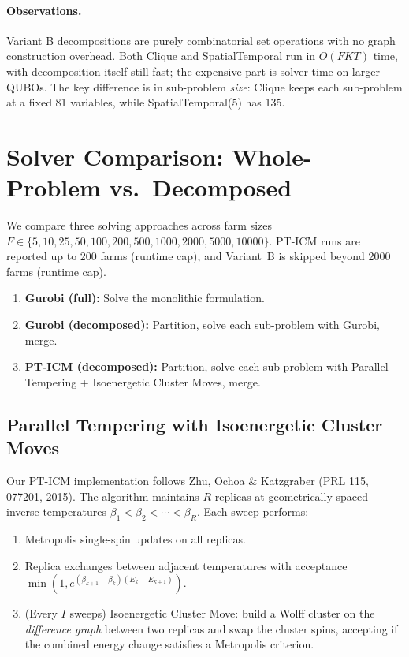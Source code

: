 \documentclass[11pt,a4paper]{article}
\begin{document}
\paragraph{Observations.}
Variant B decompositions are purely combinatorial set operations with no graph
construction overhead. Both Clique and SpatialTemporal run in $O(FKT)$ time,
with decomposition itself still fast; the expensive part is solver time on larger
QUBOs. The key difference is in sub-problem \emph{size}: Clique keeps each
sub-problem at a fixed 81 variables, while SpatialTemporal(5) has 135.

\section{Solver Comparison: Whole-Problem vs.\ Decomposed}
\label{sec:solvers}

We compare three solving approaches across farm sizes
$F \in \{5, 10, 25, 50, 100, 200, 500, 1000, 2000, 5000, 10000\}$.
PT-ICM runs are reported up to 200 farms (runtime cap), and Variant~B is skipped
beyond 2000 farms (runtime cap).

\begin{enumerate}
  \item \textbf{Gurobi (full):} Solve the monolithic formulation.
  \item \textbf{Gurobi (decomposed):} Partition, solve each sub-problem with Gurobi,
    merge.
  \item \textbf{PT-ICM (decomposed):} Partition, solve each sub-problem with Parallel
    Tempering + Isoenergetic Cluster Moves, merge.
\end{enumerate}

\subsection{Parallel Tempering with Isoenergetic Cluster Moves}

Our PT-ICM implementation follows Zhu, Ochoa \& Katzgraber (PRL 115, 077201, 2015).
The algorithm maintains $R$ replicas at geometrically spaced inverse temperatures
$\beta_1 < \beta_2 < \cdots < \beta_R$.  Each sweep performs:

\begin{enumerate}
  \item Metropolis single-spin updates on all replicas.
  \item Replica exchanges between adjacent temperatures with acceptance
    $\min(1, e^{(\beta_{k+1}-\beta_k)(E_k - E_{k+1})})$.
  \item (Every $I$ sweeps) Isoenergetic Cluster Move: build a Wolff cluster on the
    \emph{difference graph} between two replicas and swap the cluster spins, accepting
    if the combined energy change satisfies a Metropolis criterion.
\end{enumerate}
\end{document}
